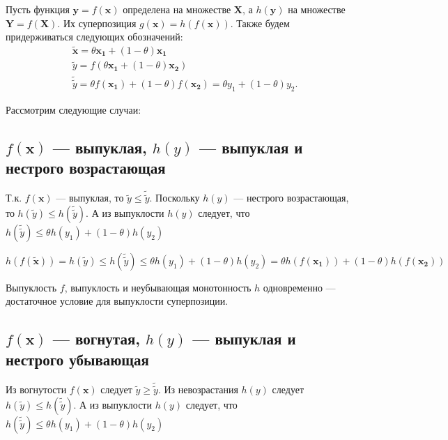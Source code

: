 	Пусть функция $\mathbf{y} = f(\mathbf{x})$ определена на множестве
	$\mathbf{X}$, а $h(\mathbf{y})$ на множестве $\mathbf{Y} = f(\mathbf{X})$. Их суперпозиция $g(\mathbf{x}) = h(f(\mathbf{x}))$. Также
	будем придерживаться следующих обозначений:
	\begin{equation}
	\begin{split}
	 &\mathbf{\tilde{x}} = \theta
	\mathbf{x_1} + (1-\theta )\mathbf{x_1}\\
	&\tilde{y} = f(\theta \mathbf{x_1} +
	(1-\theta )\mathbf{x_2})\\
	 &\tilde{\tilde{y}} = \theta  f(\mathbf{x_1})
	+ (1-\theta )f(\mathbf{x_2}) =\theta  y_1 + (1-\theta )y_2  . 
	\end{split}
	\end{equation}
	
	Рассмотрим следующие случаи:
	
	\subsection{$f(\mathbf{x})$ --- выпуклая, $h(y)$ --- выпуклая и нестрого
		возрастающая}
	
	Т.к. $f(\mathbf{x})$ --- выпуклая, то $\tilde{y} \leqslant \tilde{\tilde{y}}$.
	Поскольку $h(y)$ --- нестрого возрастающая, то $ h(\tilde{y}) \leqslant
	h({\tilde{\tilde{y}}})$. А из выпуклости $h(y)$ следует, что
	$h(\tilde{\tilde{y}}) \leqslant \theta h(y_1) + (1 - \theta) h(y_2)$
	
	\begin{equation}
	h(f(\mathbf{\tilde{x}})) =h( \tilde{y}) \leqslant h(\tilde{\tilde{y}})
	\leqslant \theta h(y_1) + (1 - \theta) h(y_2) = \theta h(f(\mathbf{x_1})) + (1 -
	\theta) h(f(\mathbf{x_2}))
	\end{equation}
	
	Выпуклость $f$, выпуклость и неубывающая монотонность $h$ одновременно ---
	достаточное условие для выпуклости суперпозиции.
	
	\subsection{$f(\mathbf{x})$ --- вогнутая, $h(y)$ --- выпуклая и нестрого
		убывающая}
	
	Из вогнутости $f(\mathbf{x})$ следует $\tilde{y} \geqslant \tilde{\tilde{y}}$.
	Из невозрастания $h(y)$ следует $ h(\tilde{y}) \leqslant
	h({\tilde{\tilde{y}}})$. А из выпуклости $h(y)$ следует, что
	$h(\tilde{\tilde{y}}) \leqslant \theta h(y_1) + (1 - \theta) h(y_2)$
	
